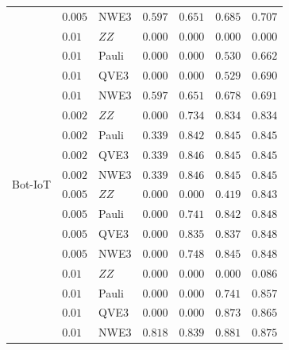 \begin{table}[t]
\begin{tabular}{@{}lllrrrr@{}}
 & $0.005$ & NWE3 & $0.597$ & $0.651$ & $0.685$ & $0.707$ \\
 & $0.01$ & $ZZ$ & $0.000$ & $0.000$ & $0.000$ & $0.000$ \\
 & $0.01$ & Pauli & $0.000$ & $0.000$ & $0.530$ & $0.662$ \\
 & $0.01$ & QVE3 & $0.000$ & $0.000$ & $0.529$ & $0.690$ \\
 & $0.01$ & NWE3 & $0.597$ & $0.651$ & $0.678$ & $0.691$ \\
\midrule
\multirow{8}{*}{Bot-IoT}
 & $0.002$ & $ZZ$ & $0.000$ & $0.734$ & $0.834$ & $0.834$ \\
 & $0.002$ & Pauli & $0.339$ & $0.842$ & $0.845$ & $0.845$ \\
 & $0.002$ & QVE3 & $0.339$ & $0.846$ & $0.845$ & $0.845$ \\
 & $0.002$ & NWE3 & $0.339$ & $0.846$ & $0.845$ & $0.845$ \\
 & $0.005$ & $ZZ$ & $0.000$ & $0.000$ & $0.419$ & $0.843$ \\
 & $0.005$ & Pauli & $0.000$ & $0.741$ & $0.842$ & $0.848$ \\
 & $0.005$ & QVE3 & $0.000$ & $0.835$ & $0.837$ & $0.848$ \\
 & $0.005$ & NWE3 & $0.000$ & $0.748$ & $0.845$ & $0.848$ \\
 & $0.01$ & $ZZ$ & $0.000$ & $0.000$ & $0.000$ & $0.086$ \\
 & $0.01$ & Pauli & $0.000$ & $0.000$ & $0.741$ & $0.857$ \\
 & $0.01$ & QVE3 & $0.000$ & $0.000$ & $0.873$ & $0.865$ \\
 & $0.01$ & NWE3 & $0.818$ & $0.839$ & $0.881$ & $0.875$ \\
\bottomrule
\end{tabular}
\end{table}
